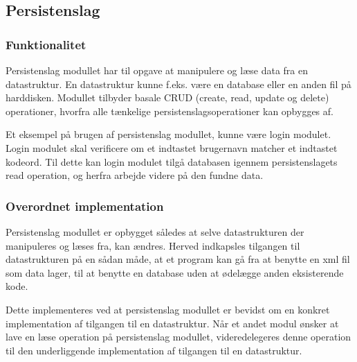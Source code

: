 \subsection{Persistenslag}
\label{sub:persistenslag}

\subsubsection{Funktionalitet}
\label{ssub:Funktionalitet}

Persistenslag modullet har til opgave at manipulere og læse data fra en datastruktur. En datastruktur kunne f.eks. være en database eller en anden fil på harddisken. Modullet tilbyder basale CRUD (create, read, update og delete) operationer, hvorfra alle tænkelige persistenslagsoperationer kan opbygges af.

Et eksempel på brugen af persistenslag modullet, kunne være login modulet. Login modulet skal verificere om et indtastet brugernavn matcher et indtastet kodeord. Til dette kan login modulet tilgå databasen igennem persistenslagets read operation, og herfra arbejde videre på den fundne data.


\subsubsection{Overordnet implementation}
\label{ssub:Implementation}

Persistenslag modullet er opbygget således at selve datastrukturen der manipuleres og læses fra, kan ændres. Herved indkapsles tilgangen til datastrukturen på en sådan måde, at et program kan gå fra at benytte en xml fil som data lager, til at benytte en database uden at ødelægge anden eksisterende kode.

Dette implementeres ved at persistenslag modullet er bevidst om en konkret implementation af tilgangen til en datastruktur. Når et andet modul ønsker at lave en læse operation på persistenslag modullet, videredelegeres denne operation til den underliggende implementation af tilgangen til en datastruktur.
